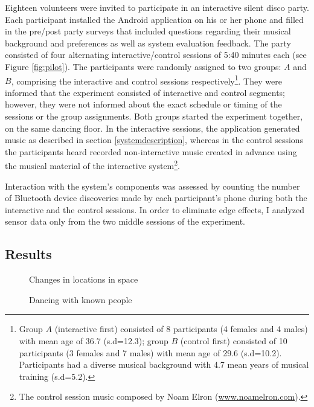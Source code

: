 \documentclass[a4paper,11pt]{article}
\begin{document}
{Eighteen volunteers were invited to participate in an interactive silent disco party.
Each participant installed the Android application on his or her phone and filled in the pre/post party surveys that included questions regarding their musical background and preferences as well as system evaluation feedback.
The party consisted of four alternating interactive/control sessions of 5:40 minutes each (see Figure \ref{fig:pilot}).
The participants were randomly assigned to two groups: $A$ and $B$, comprising the interactive and control sessions respectively\footnote{Group $A$ (interactive first) consisted of 8 participants (4 females and 4 males) with mean age of 36.7 (s.d=12.3); group $B$ (control first) consisted of 10 participants (3 females and 7 males) with mean age of 29.6 (s.d=10.2). Participants had a diverse musical background with 4.7 mean years of musical training (s.d=5.2).}.
They were informed that the experiment consisted of interactive and control segments;
however, they were not informed about the exact schedule or timing of the sessions or the group assignments.
Both groups started the experiment together, on the same dancing floor.
In the interactive sessions, the application generated music as described in section \ref{systemdescription}, whereas in the control sessions the participants heard recorded non-interactive music created in advance using the musical material of the interactive system\footnote{The control session music composed by Noam Elron (\href{http://www.noamelron.com}{www.noamelron.com}).}.

Interaction with the system's components was assessed by counting the number of Bluetooth device discoveries made by each participant's phone during both the interactive and the control sessions.
In order to eliminate edge effects, I analyzed sensor data only from the two middle sessions of the experiment.

\subsection{Results}

\begin{figure}[!htb]
	\def\svgwidth{0.95\columnwidth}
  	
	\caption{Changes in locations in space}\label{fig:location}
\endminipage\hfill
{}
	\def\svgwidth{0.95\columnwidth}
	
	\caption{Dancing with known people}\label{fig:known}
\endminipage\hfill
\end{figure}

}
\end{document}
